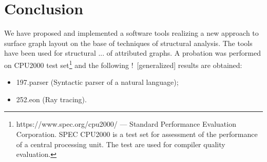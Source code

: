 \documentclass[conference]{IEEEtran}
\newcommand{\nnn}[2][ncolor]{\noindent%
\textcolor{eclr}{!\ [}\textcolor{#1}{#2}\textcolor{eclr}{]}}
\begin{document}
%






\section{Conclusion}
We have proposed and implemented a software tools realizing a new approach to surface graph layout on the base of techniques of structural analysis.  The tools have been used for structural ... of attributed graphs.  A probation was performed on CPU2000 test set\footnote{https://www.spec.org/cpu2000/ --- Standard Performance Evaluation Corporation.  SPEC CPU2000 is a test set for assessment of the performance of a central processing unit. The test are used for compiler quality evaluation.} and the following \nnn{generalized} results are obtained:
\begin{itemize}
\item 197.parser (Syntactic parser of a natural language);
\item 252.eon (Ray tracing).
\end{itemize}
\end{document}
